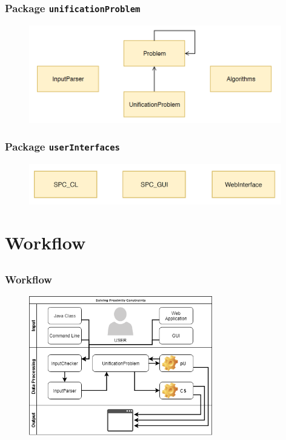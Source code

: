 
	\begin{frame}[fragile=singleslide]
	\frametitle{Package \texttt{unificationProblem}}
	 
	\begin{figure}
		\centering
			\includegraphics[width=11cm]{Bilder/unificationProblem.PNG}
		\label{fig:uP}
	\end{figure}
	
  \end{frame}	
	
	
	\begin{frame}[fragile=singleslide]
	\frametitle{Package \texttt{userInterfaces}}
	 
	\begin{figure}
		\centering
			\includegraphics[width=11cm]{Bilder/userInterfaces.PNG}
		\label{fig:uI}
	\end{figure}
	
  \end{frame}

	\section{Workflow} \subsection{}
	
		\begin{frame}[fragile=singleslide]
		\frametitle{Workflow}
		
		\begin{figure}
			\centering
				\includegraphics[width=8cm]{Bilder/WorkFlow.PNG}
			\label{fig:WorkFlow}
		\end{figure}
		
		\end{frame}

